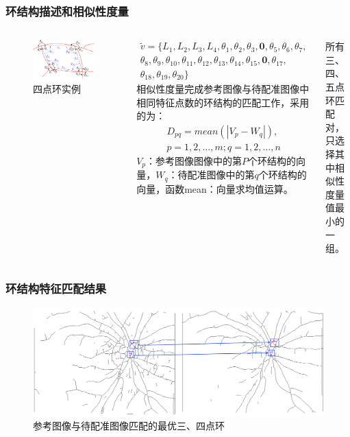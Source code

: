 \documentclass[notheorems,mathserif,table,compress]{beamer}  %
\begin{document}
 \begin{frame}
 \frametitle{环结构描述和相似性度量}
 \begin{columns}
\begin{figure}[ht!]
\centering
\includegraphics[width=0.8\linewidth]{description.png}
\caption{四点环实例}
 \end{figure}
  \begin{equation*}
 \begin{split}
\tilde{v}=\{L_{1},L_{2},L_{3},L_{4},\theta_{1},\theta_{2},\theta_{3},\mathbf{0},\theta_{5},\theta_{6},\theta_{7},\\\theta_{8},\theta_{9},\theta_{10},\theta_{11},\theta_{12},\theta_{13},\theta_{14},\theta_{15},\mathbf{0},\theta_{17},\\\theta_{18},\theta_{19},\theta_{20}\}
 \end{split}
 \end{equation*}
相似性度量完成参考图像与待配准图像中相同特征点数的环结构的匹配工作，采用的为{\color{blue}{曼哈顿距离}}：
 \begin{align*}
D_{pq} = mean(|V_p-W_q|),\\
 p = 1, 2, \ldots, m; q = 1, 2, \ldots, n
\end{align*}
$V_p$：参考图像图像中的第$P$个环结构的向量，$W_q$：待配准图像中的第$q$个环结构的向量，函数mean：向量求均值运算。
	
{} 	

所有三、四、五点环匹配对，只选择其中相似性度量值最小的一组。
\end{columns}
\end{frame}


\begin{frame}
\frametitle{环结构特征匹配结果}
   \begin{figure}[ht!]
    \centering
  \includegraphics[width=\linewidth]{207-208}
  \caption{参考图像与待配准图像匹配的最优三、四点环}
 \end{figure}
\end{frame}
\end{document}
